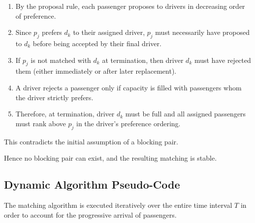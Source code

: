 \documentclass[12pt, a4paper]{article}
\begin{document}
\begin{enumerate}

    \item By the proposal rule, each passenger proposes to drivers in decreasing order of preference.

    \item Since $p_j$ prefers $d_k$ to their assigned driver, $p_j$ must necessarily have proposed to $d_k$ before being accepted by their final driver.

    \item If $p_j$ is not matched with $d_k$ at termination, then driver $d_k$ must have rejected them (either immediately or after later replacement).

    \item A driver rejects a passenger only if capacity is filled with passengers whom the driver strictly prefers.

    \item Therefore, at termination, driver $d_k$ must be full and all assigned passengers must rank above $p_j$ in the driver's preference ordering.

\end{enumerate}

This contradicts the initial assumption of a blocking pair.

Hence no blocking pair can exist, and the resulting matching is stable.


\subsection{Dynamic Algorithm Pseudo-Code}

The matching algorithm is executed iteratively over the entire time interval $T$ in order to account for the progressive arrival of passengers.
\end{document}
